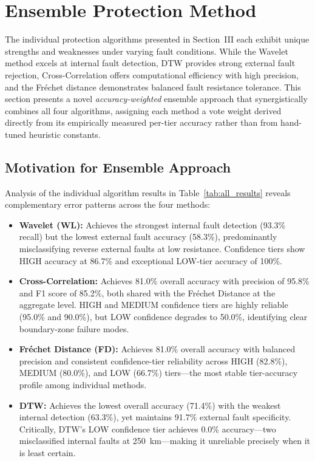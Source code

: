 \documentclass[journal]{IEEEtran}
\begin{document}
\section{Ensemble Protection Method}

The individual protection algorithms presented in Section~III each exhibit
unique strengths and weaknesses under varying fault conditions. While the
Wavelet method excels at internal fault detection, DTW provides strong
external fault rejection, Cross-Correlation offers computational efficiency
with high precision, and the Fr\'{e}chet distance demonstrates balanced
fault resistance tolerance. This section presents a novel
\emph{accuracy-weighted} ensemble approach that synergistically combines
all four algorithms, assigning each method a vote weight derived directly
from its empirically measured per-tier accuracy rather than from
hand-tuned heuristic constants.

\subsection{Motivation for Ensemble Approach}

Analysis of the individual algorithm results in Table~\ref{tab:all_results}
reveals complementary error patterns across the four methods:

\begin{itemize}
    \item \textbf{Wavelet (WL):} Achieves the strongest internal fault
    detection (93.3\% recall) but the lowest external fault accuracy
    (58.3\%), predominantly misclassifying reverse external faults at
    low resistance. Confidence tiers show HIGH accuracy at 86.7\% and
    exceptional LOW-tier accuracy of 100\%.

    \item \textbf{Cross-Correlation:} Achieves 81.0\% overall accuracy
with precision of 95.8\% and F1 score of 85.2\%, both shared with
the Fr\'{e}chet Distance at the aggregate level. HIGH and MEDIUM
confidence tiers are highly reliable (95.0\% and 90.0\%), but LOW
confidence degrades to 50.0\%, identifying clear boundary-zone
failure modes.

    \item \textbf{Fr\'{e}chet Distance (FD):} Achieves 81.0\% overall
    accuracy with balanced precision and consistent confidence-tier
    reliability across HIGH (82.8\%), MEDIUM (80.0\%), and LOW (66.7\%)
    tiers---the most stable tier-accuracy profile among individual
    methods.

    \item \textbf{DTW:} Achieves the lowest overall accuracy (71.4\%)
    with the weakest internal detection (63.3\%), yet maintains 91.7\%
    external fault specificity. Critically, DTW's LOW confidence tier
    achieves 0.0\% accuracy---two misclassified internal faults at
    250~km---making it unreliable precisely when it is least certain.
\end{itemize}
\end{document}

